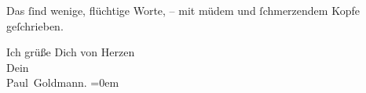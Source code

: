 \pstart
           Das{ }ſind wenige, flüchtige Worte, – mit müdem und{ }ſchmerzendem Kopfe geſchrieben.\pend
           
\pstart
           Ich grüße Dich von Herzen {\\[\baselineskip]}Dein {\\[\baselineskip]}\spacefill\mbox{Paul Goldmann.}\pend
           \leftskip=0em{}\endnumbering{}  \newcommand{\dateiname}{L02904}\newcommand{\titel}{Paul Goldmann an Arthur Schnitzler, 11. 2. 1900}\newcommand{\editorInnen}{Martin Anton Müller und Laura Untner}
